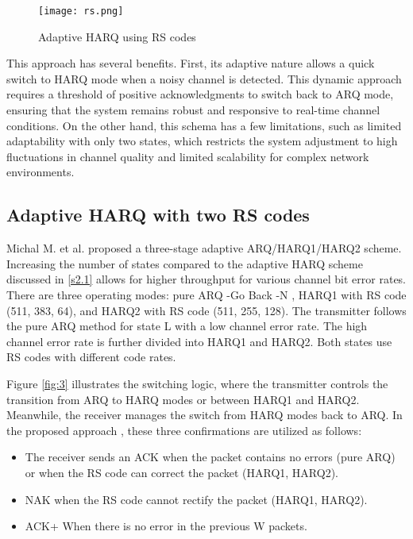 \documentclass[sn-mathphys-num]{sn-jnl}
\theoremstyle{thmstyleone}
\theoremstyle{thmstyletwo}%
\theoremstyle{thmstylethree}%
\begin{document}
\begin{figure}[H]
    \centering
    \texttt{[image: rs.png]}
    \caption{Adaptive HARQ using RS codes}
    \label{fig:2}
\end{figure}

This approach has several benefits. First, its adaptive nature allows a quick switch to HARQ mode when a noisy channel is detected. This dynamic approach requires a threshold of positive acknowledgments to switch back to ARQ mode, ensuring that the system remains robust and responsive to real-time channel conditions. On the other hand, this schema has a few limitations, such as limited adaptability with only two states, which restricts the system adjustment to high fluctuations in channel quality and limited scalability for complex network environments.

\subsection{Adaptive HARQ with two RS codes} \label{s2.2}

Michal M. et al. \cite{r8} proposed a three-stage adaptive ARQ/HARQ1/HARQ2 scheme. Increasing the number of states compared to the adaptive HARQ scheme discussed in \ref{s2.1} allows for higher throughput for various channel bit error rates. There are three operating modes: pure ARQ -Go Back -N \cite{r18}, HARQ1 with RS code (511, 383, 64), and HARQ2 with RS code (511, 255, 128).  The transmitter follows the pure ARQ method for state L with a low channel error rate. The high channel error rate is further divided into HARQ1 and HARQ2. Both states use RS codes with different code rates.

Figure \ref{fig:3} \cite{r8} illustrates the switching logic, where the transmitter controls the transition from ARQ to HARQ modes or between HARQ1 and HARQ2. Meanwhile, the receiver manages the switch from HARQ modes back to ARQ. In the proposed approach \cite{r8}, these three confirmations are utilized as follows:

   \begin{itemize}
       \item The receiver sends an ACK when the packet contains no errors (pure ARQ) or when the RS code can correct the packet (HARQ1, HARQ2).
       \item NAK when the RS code cannot rectify the packet (HARQ1, HARQ2).
       \item  ACK+   When there is no error in the previous W packets.
   \end{itemize}
\end{document}
